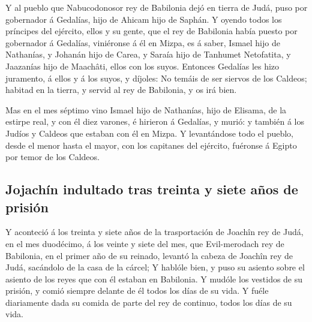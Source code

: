  Y al pueblo que Nabucodonosor rey de Babilonia dejó en
tierra de Judá, puso por gobernador á Gedalías, hijo de Ahicam hijo de
Saphán.  Y oyendo todos los príncipes del ejército, ellos y
su gente, que el rey de Babilonia había puesto por gobernador á
Gedalías, viniéronse á él en Mizpa, es á saber, Ismael hijo de
Nathanías, y Johanán hijo de Carea, y Saraía hijo de Tanhumet
Netofatita, y Jaazanías hijo de Maachâti, ellos con los suyos.
 Entonces Gedalías les hizo juramento, á ellos y á los
suyos, y díjoles: No temáis de ser siervos de los Caldeos; habitad en la
tierra, y servid al rey de Babilonia, y os irá bien.

 Mas en el mes séptimo vino Ismael hijo de Nathanías, hijo
de Elisama, de la estirpe real, y con él diez varones, é hirieron á
Gedalías, y murió: y también á los Judíos y Caldeos que estaban con él
en Mizpa.  Y levantándose todo el pueblo, desde el menor
hasta el mayor, con los capitanes del ejército, fuéronse á Egipto por
temor de los Caldeos.

\hypertarget{jojachuxedn-indultado-tras-treinta-y-siete-auxf1os-de-prisiuxf3n}{%
\subsection{Jojachín indultado tras treinta y siete años de
prisión}\label{jojachuxedn-indultado-tras-treinta-y-siete-auxf1os-de-prisiuxf3n}}

 Y aconteció á los treinta y siete años de la trasportación
de Joachîn rey de Judá, en el mes duodécimo, á los veinte y siete del
mes, que Evil-merodach rey de Babilonia, en el primer año de su reinado,
levantó la cabeza de Joachîn rey de Judá, sacándolo de la casa de la
cárcel;  Y hablóle bien, y puso su asiento sobre el asiento
de los reyes que con él estaban en Babilonia.  Y mudóle los
vestidos de su prisión, y comió siempre delante de él todos los días de
su vida.  Y fuéle diariamente dada su comida de parte del
rey de continuo, todos los días de su vida.

